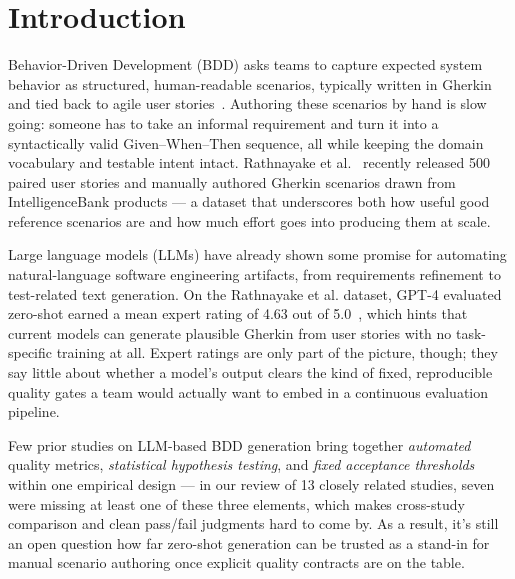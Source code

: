 \section{Introduction}
\label{sec:introduction}

Behavior-Driven Development (BDD) asks teams to capture expected system behavior as structured, human-readable scenarios, typically written in Gherkin and tied back to agile user stories~\cite{cucumber2023gherkin}.
Authoring these scenarios by hand is slow going: someone has to take an informal requirement and turn it into a syntactically valid Given--When--Then sequence, all while keeping the domain vocabulary and testable intent intact.
Rathnayake et al.~\cite{rathnayake2026llm} recently released 500 paired user stories and manually authored Gherkin scenarios drawn from IntelligenceBank products --- a dataset that underscores both how useful good reference scenarios are and how much effort goes into producing them at scale.

Large language models (LLMs) have already shown some promise for automating natural-language software engineering artifacts, from requirements refinement to test-related text generation.
On the Rathnayake et al. dataset, GPT-4 evaluated zero-shot earned a mean expert rating of 4.63 out of 5.0~\cite{rathnayake2026llm}, which hints that current models can generate plausible Gherkin from user stories with no task-specific training at all.
Expert ratings are only part of the picture, though; they say little about whether a model's output clears the kind of fixed, reproducible quality gates a team would actually want to embed in a continuous evaluation pipeline.

Few prior studies on LLM-based BDD generation bring together \emph{automated} quality metrics, \emph{statistical hypothesis testing}, and \emph{fixed acceptance thresholds} within one empirical design --- in our review of 13 closely related studies, seven were missing at least one of these three elements, which makes cross-study comparison and clean pass/fail judgments hard to come by.
As a result, it's still an open question how far zero-shot generation can be trusted as a stand-in for manual scenario authoring once explicit quality contracts are on the table.

